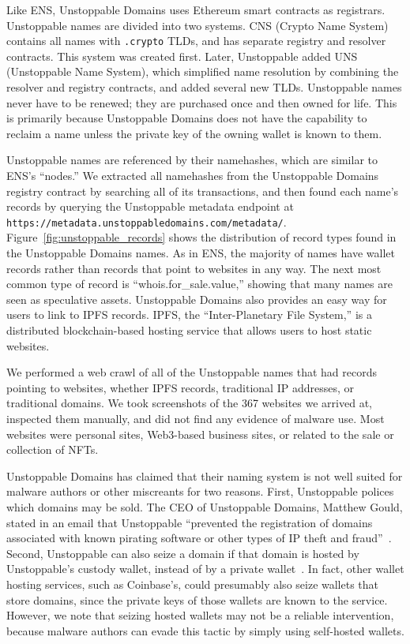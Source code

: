 \documentclass[10pt,sigconf,letterpaper]{acmart}
\begin{document}

Like ENS, Unstoppable Domains uses Ethereum smart contracts as 
registrars. Unstoppable names are divided into two systems. CNS 
(Crypto Name System) contains all names with \texttt{.crypto} 
TLDs, and has separate registry and resolver contracts. This 
system was created first. Later, Unstoppable added UNS 
(Unstoppable Name System), which simplified name resolution by 
combining the resolver and registry contracts, and added several 
new TLDs. Unstoppable names never have to be renewed; they are 
purchased once and then owned for life. This is primarily 
because Unstoppable Domains does not have the capability to 
reclaim a name unless the private key of the owning wallet is 
known to them. 

Unstoppable names are referenced by their namehashes, which are 
similar to ENS's ``nodes.'' We extracted all namehashes from the 
Unstoppable Domains registry contract by searching all of its 
transactions, and then found each name's records by querying the 
Unstoppable metadata endpoint at 
\texttt{https://metadata.unstoppabledomains.com/metadata/}. 
Figure~\ref{fig:unstoppable_records} shows the 
distribution 
of record types found in the Unstoppable Domains names. As in 
ENS, the majority of names have wallet records rather than 
records that point to websites in any way. The next most common 
type of record is ``whois.for\_sale.value,'' showing that many 
names are seen as speculative assets. Unstoppable Domains also 
provides an easy way for users to link to IPFS records. IPFS, 
the ``Inter-Planetary File System,'' is a distributed 
blockchain-based hosting service that allows users to host 
static websites.

We performed a web crawl of all of the Unstoppable names that 
had records pointing to websites, whether IPFS records, 
traditional IP addresses, or traditional domains. We took 
screenshots of the 367 websites we arrived 
at, inspected them manually, and did not find any evidence of 
malware use. Most 
websites were personal sites, Web3-based business sites, or related to the sale 
or collection of NFTs. 

Unstoppable Domains has claimed that their naming system is not well suited for 
malware authors or other miscreants for two reasons. First, Unstoppable 
polices which domains may be sold. The CEO of Unstoppable Domains, Matthew 
Gould, stated in an email that Unstoppable ``prevented the 
registration of domains associated with known pirating software or other types 
of IP theft and fraud''~\cite{pegoraro_blockchain_2021}. Second, Unstoppable 
can also seize a domain if that 
domain is hosted by Unstoppable's custody 
wallet, instead of by a private wallet~\cite{pegoraro_blockchain_2021}. In 
fact, other wallet hosting 
services, such as Coinbase's, 
could presumably also seize wallets that store domains, since the private 
keys of those wallets are 
known to the service. However, we note that seizing hosted wallets may not 
be a reliable 
intervention, because malware authors can evade this tactic by simply using 
self-hosted wallets. 
\end{document}
